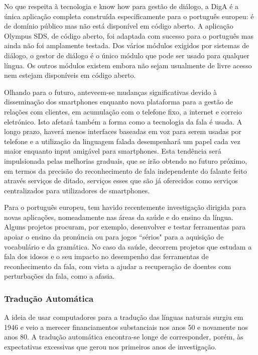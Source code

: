 \begin{multicols}{2}
No que respeita à tecnologia e know how para gestão de diá\-lo\-go, a DigA é a única aplicação completa
construída especificamente para o português europeu: é de domínio público mas não está disponível em código aberto. 
A aplicação Olympus SDS, de código aberto, foi adaptada com sucesso para o português mas ainda não foi amplamente testada. 
Dos vários módulos exigidos por sistemas de diálogo, o gestor de diálogo é o único módulo que pode ser usado para qualquer língua. 
Os outros módulos existem embora não sejam usualmente de livre acesso nem estejam disponíveis em código aberto. 

Olhando para o futuro, anteveem-se mudanças significativas devido à disseminação dos smartphones enquanto nova plataforma 
para a gestão de relações com clientes, em acumulação com o telefone fixo, a internet e correio eletrónico. 
Isto afetará também a forma como a tecnologia da fala é usada. 
A longo prazo, haverá menos interfaces baseadas em voz para serem usadas por telefone 
e a utilização da linguagem falada desempenhará um papel cada vez maior enquanto input amigável para smartphones. 
Esta tendência será impulsionada pelas melhorias graduais, que se irão obtendo no futuro próximo, em termos da precisão do reconhecimento de fala independente do falante 
feito através serviços de ditado, serviços esses que são já oferecidos como serviços centralizados para utilizadores de smartphones. 

Para o português europeu, tem havido recentemente investigação dirigida para novas aplicações, nomeadamente nas áreas da saúde e do ensino da língua. 
Alguns projetos procuram, por exemplo, desenvolver e testar ferramentas para apoiar o ensino da pronúncia ou para jogos “sérios" 
para a aquisição de vocabulário e da gramática. No caso da saúde, decorrem projetos que estudam a fala dos idosos
e o seu impacto no desempenho das ferramentas de reconhecimento da fala, com vista a ajudar a recuperação 
de doentes com perturbações da fala, como a afasia.



\subsubsection{Tradução Automática}

A ideia de usar computadores para a tradução das línguas naturais surgiu em 1946 e veio a merecer financiamentos substanciais nos anos 50 e novamente nos anos 80. 
A tradução automática encontra-se longe de corresponder, porém, às expectativas excessivas que gerou nos primeiros anos de investigação.


\end{multicols}
